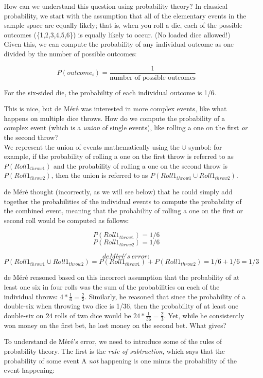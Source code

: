 \documentclass[12pt,]{book}
\theoremstyle{definition}
\theoremstyle{definition}
\theoremstyle{definition}
\theoremstyle{remark}
\begin{document}
How can we understand this question using probability theory? In classical probability, we start with the assumption that all of the elementary events in the sample space are equally likely; that is, when you roll a die, each of the possible outcomes (\{1,2,3,4,5,6\}) is equally likely to occur. (No loaded dice allowed!) Given this, we can compute the probability of any individual outcome as one divided by the number of possible outcomes:

\[
P(outcome_i) = \frac{1}{\text{number of possible outcomes}}
\]

For the six-sided die, the probability of each individual outcome is 1/6.

This is nice, but de Méré was interested in more complex events, like what happens on multiple dice throws. How do we compute the probability of a complex event (which is a \emph{union} of single events), like rolling a one on the first \emph{or} the second throw?\\
We represent the union of events mathematically using the \(\cup\) symbol: for example, if the probability of rolling a one on the first throw is referred to as \(P(Roll1_{throw1})\) and the probability of rolling a one on the second throw is \(P(Roll1_{throw2})\), then the union is referred to as \(P(Roll1_{throw1} \cup Roll1_{throw2})\).

de Méré thought (incorrectly, as we will see below) that he could simply add together the probabilities of the individual events to compute the probability of the combined event, meaning that the probability of rolling a one on the first or second roll would be computed as follows:

\[
P(Roll1_{throw1}) = 1/6
\]
\[
P(Roll1_{throw2}) = 1/6
\]

\[
de Méré's \ error:
\]
\[
P(Roll1_{throw1} \cup Roll1_{throw2}) = P(Roll1_{throw1}) + P(Roll1_{throw2}) = 1/6 + 1/6 = 1/3
\]

de Méré reasoned based on this incorrect assumption that the probability of at least one six in four rolls was the sum of the probabilities on each of the individual throws: \(4*\frac{1}{6}=\frac{2}{3}\). Similarly, he reasoned that since the probability of a double-six when throwing two dice is 1/36, then the probability of at least one double-six on 24 rolls of two dice would be \(24*\frac{1}{36}=\frac{2}{3}\). Yet, while he consistently won money on the first bet, he lost money on the second bet. What gives?

To understand de Méré's error, we need to introduce some of the rules of probability theory. The first is the \emph{rule of subtraction}, which says that the probability of some event A \emph{not} happening is one minus the probability of the event happening:
\end{document}
